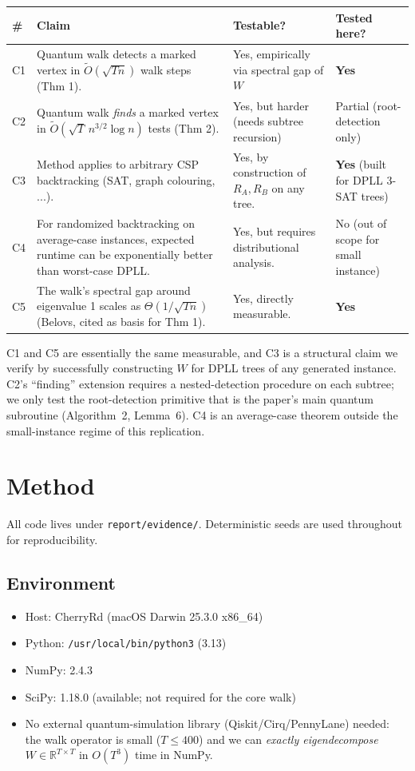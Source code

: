 \documentclass[11pt]{article}
\begin{document}
\begin{center}
\begin{tabular}{lp{6cm}ll}
\toprule
\# & Claim & Testable? & Tested here? \\
\midrule
C1 & Quantum walk detects a marked vertex in $\tilde O(\sqrt{Tn})$ walk steps (Thm 1). & Yes, empirically via spectral gap of $W$ & \textbf{Yes} \\
C2 & Quantum walk \emph{finds} a marked vertex in $\tilde O(\sqrt{T}\,n^{3/2}\log n)$ tests (Thm 2). & Yes, but harder (needs subtree recursion) & Partial (root-detection only) \\
C3 & Method applies to arbitrary CSP backtracking (SAT, graph colouring, ...). & Yes, by construction of $R_A,R_B$ on any tree. & \textbf{Yes} (built for DPLL 3-SAT trees) \\
C4 & For randomized backtracking on average-case instances, expected runtime can be exponentially better than worst-case DPLL. & Yes, but requires distributional analysis. & No (out of scope for small instance) \\
C5 & The walk's spectral gap around eigenvalue 1 scales as $\Theta(1/\sqrt{Tn})$ (Belovs, cited as basis for Thm 1). & Yes, directly measurable. & \textbf{Yes} \\
\bottomrule
\end{tabular}
\end{center}

C1 and C5 are essentially the same measurable, and C3 is a structural claim we
verify by successfully constructing $W$ for DPLL trees of any generated
instance. C2's ``finding'' extension requires a nested-detection procedure on
each subtree; we only test the root-detection primitive that is the paper's
main quantum subroutine (Algorithm~2, Lemma~6). C4 is an average-case theorem
outside the small-instance regime of this replication.

\section{Method}
\label{sec:method}

All code lives under \texttt{report/evidence/}. Deterministic seeds are used
throughout for reproducibility.

\subsection{Environment}
\begin{itemize}
  \item Host: CherryRd (macOS Darwin 25.3.0 x86\_64)
  \item Python: \texttt{/usr/local/bin/python3} (3.13)
  \item NumPy: 2.4.3
  \item SciPy: 1.18.0 (available; not required for the core walk)
  \item No external quantum-simulation library (Qiskit/Cirq/PennyLane) needed:
        the walk operator is small ($T \le 400$) and we can \emph{exactly
        eigendecompose} $W \in \mathbb{R}^{T\times T}$ in $O(T^3)$ time in NumPy.
\end{itemize}
\end{document}
